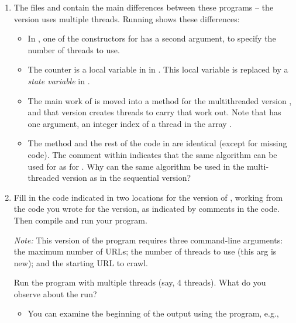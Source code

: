 \documentclass[letterpaper,10pt,openany,oneside]{sphinxmanual}
\begin{document}
\begin{enumerate}
\item {} 
The files  and 
contain the main differences between these programs -- the
 version uses multiple threads. Running  shows
these differences:
\begin{itemize}
\item {} 
In , one of the constructors for  has a
second argument, to specify the number of threads to use.

\item {} 
The counter  is a local variable in 
in . This local variable is replaced by a \emph{state
variable}  in .

\item {} 
The main work of  is moved into a method  for
the multithreaded version , and that version creates
 threads to carry that work out. Note that
 has one argument, an integer index of a thread in the
array .

\item {} 
The method  and the rest of the code in
 are identical (except for missing code). The
comment within  indicates that the same algorithm can
be used for  as for . Why can the same
algorithm be used in the multi-threaded version as in the
sequential version?

\end{itemize}

\item {} 
Fill in the code indicated in two locations for the 
version of , working from the code you wrote for the
 version, as indicated by comments in the 
code. Then compile and run your program.

\emph{Note:} This version of the program requires three command-line
arguments: the maximum number of URLs; the number of threads to use
(this arg is new); and the starting URL to crawl.

Run the program with multiple threads (say, 4 threads). What do you
observe about the run?
\begin{itemize}
\item {} 
You can examine the beginning of the output using the 
program, e.g.,


\end{itemize}
\end{enumerate}
\end{document}
